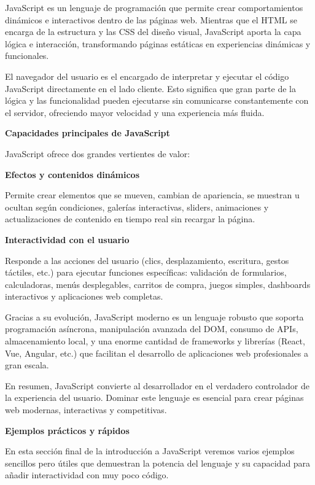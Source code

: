 \documentclass[11.5pt]{article}
\begin{document}
	JavaScript es un lenguaje de programación que permite crear comportamientos dinámicos e interactivos dentro de las páginas web. Mientras que el HTML se encarga de la estructura y las CSS del diseño visual, JavaScript aporta la capa lógica e interacción, transformando páginas estáticas en experiencias dinámicas y funcionales.
	
	El navegador del usuario es el encargado de interpretar y ejecutar el código JavaScript directamente en el lado cliente. Esto significa que gran parte de la lógica y las funcionalidad pueden ejecutarse sin comunicarse constantemente con el servidor, ofreciendo mayor velocidad y una experiencia más fluida.
	
	\noindent\textbf{{\large Capacidades principales de JavaScript}}
	
	JavaScript ofrece dos grandes vertientes de valor:
	
	\noindent\textbf{{\small Efectos y contenidos dinámicos}}
	
	Permite crear elementos que se mueven, cambian de apariencia, se muestran u ocultan según condiciones, galerías interactivas, sliders, animaciones y actualizaciones de contenido en tiempo real sin recargar la página.
	
	\noindent\textbf{{\small Interactividad con el usuario}}
	
	Responde a las acciones del usuario (clics, desplazamiento, escritura, gestos táctiles, etc.) para ejecutar funciones específicas: validación de formularios, calculadoras, menús desplegables, carritos de compra, juegos simples, dashboards interactivos y aplicaciones web completas.
	
	Gracias a su evolución, JavaScript moderno es un lenguaje robusto que soporta programación asíncrona, manipulación avanzada del DOM, consumo de APIs, almacenamiento local, y una enorme cantidad de frameworks y librerías (React, Vue, Angular, etc.) que facilitan el desarrollo de aplicaciones web profesionales a gran escala.
	
	En resumen, JavaScript convierte al desarrollador en el verdadero controlador de la experiencia del usuario. Dominar este lenguaje es esencial para crear páginas web modernas, interactivas y competitivas.
	
	\noindent\textbf{{\large Ejemplos prácticos y rápidos}}
	
	En esta sección final de la introducción a JavaScript veremos varios ejemplos sencillos pero útiles que demuestran la potencia del lenguaje y su capacidad para añadir interactividad con muy poco código.
	
\end{document}
